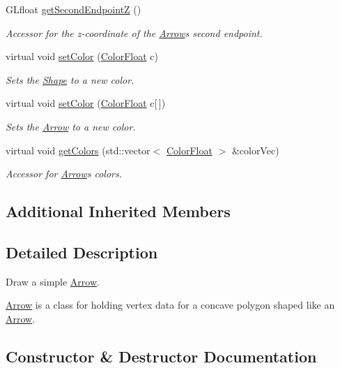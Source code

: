 \begin{DoxyCompactItemize}
G\+Lfloat \hyperlink{classtsgl_1_1_arrow_adb3bf6b1bc75ab68bb89f5430358386a}{get\+Second\+EndpointZ} ()
\begin{DoxyCompactList}\small\item\em Accessor for the z-\/coordinate of the \hyperlink{classtsgl_1_1_arrow}{Arrow}\textquotesingle{}s second endpoint. \end{DoxyCompactList}\item 
virtual void \hyperlink{classtsgl_1_1_arrow_a4eabf87c29f3da697fe39006c45510b7}{set\+Color} (\hyperlink{structtsgl_1_1_color_float}{Color\+Float} c)
\begin{DoxyCompactList}\small\item\em Sets the \hyperlink{classtsgl_1_1_shape}{Shape} to a new color. \end{DoxyCompactList}\item 
virtual void \hyperlink{classtsgl_1_1_arrow_a7804a81f8ae4ae0208e80849438364f0}{set\+Color} (\hyperlink{structtsgl_1_1_color_float}{Color\+Float} c\mbox{[}$\,$\mbox{]})
\begin{DoxyCompactList}\small\item\em Sets the \hyperlink{classtsgl_1_1_arrow}{Arrow} to a new color. \end{DoxyCompactList}\item 
virtual void \hyperlink{classtsgl_1_1_arrow_a45f13b066c85baae9712730787f49fac}{get\+Colors} (std\+::vector$<$ \hyperlink{structtsgl_1_1_color_float}{Color\+Float} $>$ \&color\+Vec)
\begin{DoxyCompactList}\small\item\em Accessor for \hyperlink{classtsgl_1_1_arrow}{Arrow}\textquotesingle{}s colors. \end{DoxyCompactList}\end{DoxyCompactItemize}
\subsection*{Additional Inherited Members}


\subsection{Detailed Description}
Draw a simple \hyperlink{classtsgl_1_1_arrow}{Arrow}. 

\hyperlink{classtsgl_1_1_arrow}{Arrow} is a class for holding vertex data for a concave polygon shaped like an \hyperlink{classtsgl_1_1_arrow}{Arrow}. 

\subsection{Constructor \& Destructor Documentation}
\mbox{\label{classtsgl_1_1_arrow_a86e18cde9d0863fcb64ae7cdf0f6ddd1}} 
